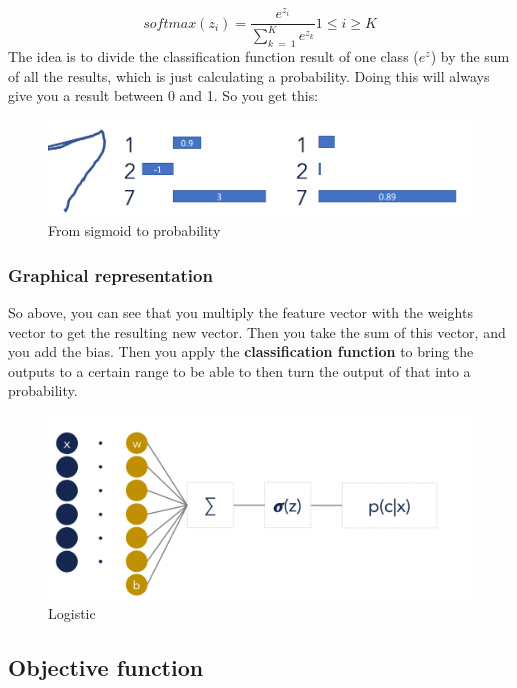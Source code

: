 \documentclass[
  11pt,
  british,
]{article}
\begin{document}
\[softmax(z_{i}) = \frac{e^{z_{i}}}{\sum\limits^{K}_{k~=~1}e^{z_{k}}} 1\leq i \geq K\]
The idea is to divide the classification function result of one class
(\(e^z\)) by the sum of all the results, which is just calculating a
probability. Doing this will always give you a result between 0 and 1.
So you get this:

\begin{figure}
\centering
\includegraphics{Pasted_image_20220603200100.png}
\caption{From sigmoid to probability}
\end{figure}

\hypertarget{graphical-representation}{%
\subsubsection{Graphical
representation}\label{graphical-representation}}

So above, you can see that you multiply the feature vector with the
weights vector to get the resulting new vector. Then you take the sum of
this vector, and you add the bias. Then you apply the
\textbf{classification function} to bring the outputs to a certain range
to be able to then turn the output of that into a probability.

\begin{figure}
\centering
\includegraphics{Pasted_image_20220603184638.png}
\caption{Logistic}
\end{figure}

\hypertarget{objective-function}{%
\subsection{Objective function}\label{objective-function}}
\end{document}
